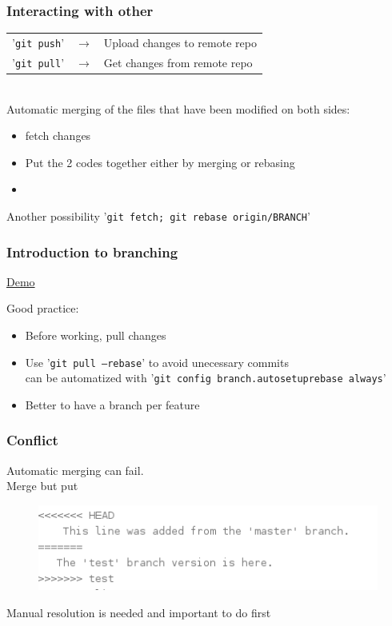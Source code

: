 \documentclass{beamer}
\newcommand{\shellcmd}[1]{'\texttt{\footnotesize #1}'}
\newcommand{\shellcmdtiny}[1]{'\texttt{\scriptsize #1}'}
\begin{document}
\begin{frame}
	\frametitle{Interacting with other}
	\begin{tabular}{l c l}
	    \shellcmd{git push} &$\rightarrow$ &Upload changes to remote repo\\
        \shellcmd{git pull} &$\rightarrow$ &Get changes from remote repo\\
	\end{tabular}
	\\\vspace{.8cm}
	Automatic merging of the files that have been modified on both sides:\\
	\begin{itemize}
	\item fetch changes
	\item Put the 2 codes together either by merging or rebasing
	\item 
\end{itemize}
	Another possibility \shellcmd{git fetch; git rebase origin/BRANCH}
	
\end{frame}

\begin{frame}
	\frametitle{Introduction to branching}
    \href{http://k.swd.cc/learnGitBranching-ja/?NODEMO}{Demo}\\\vspace{1cm}
    
    Good practice:
	\begin{itemize}
	    \item Before working, pull changes
	    \item Use \shellcmd{git pull --rebase} to avoid unecessary commits\\
        \footnotesize{can be automatized with \shellcmdtiny{git config branch.autosetuprebase always}}
        \item \normalsize Better to have a branch per feature
    \end{itemize}
\end{frame}


\begin{frame}
	\frametitle{Conflict}
	
	Automatic merging can fail.\\
	
	Merge but put 
	\begin{figure}[htp]
\centering
\includegraphics[scale=0.5]{conflict}
\end{figure}
	Manual resolution is needed and important to do first
\end{frame}
\end{document}
